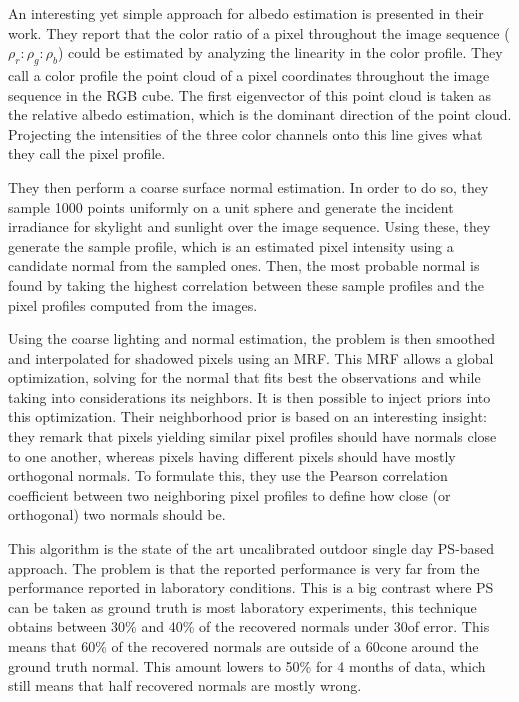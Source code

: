 An interesting yet simple approach for albedo estimation is presented in their work. They report that the color ratio of a pixel throughout the image sequence ($\rho_r : \rho_g : \rho_b$) could be estimated by analyzing the linearity in the color profile. They call a color profile the point cloud of a pixel coordinates throughout the image sequence in the RGB cube. The first eigenvector of this point cloud is taken as the relative albedo estimation, which is the dominant direction of the point cloud. Projecting the intensities of the three color channels onto this line gives what they call the pixel profile.

They then perform a coarse surface normal estimation. In order to do so, they sample 1000 points uniformly on a unit sphere and generate the incident irradiance for skylight and sunlight over the image sequence. Using these, they generate the sample profile, which is an estimated pixel intensity using a candidate normal from the sampled ones. Then, the most probable normal is found by taking the highest correlation between these sample profiles and the pixel profiles computed from the images.

Using the coarse lighting and normal estimation, the problem is then smoothed and interpolated for shadowed pixels using an MRF. This MRF allows a global optimization, solving for the normal that fits best the observations and while taking into considerations its neighbors. It is then possible to inject priors into this optimization. Their neighborhood prior is based on an interesting insight: they remark that pixels yielding similar pixel profiles should have normals close to one another, whereas pixels having different pixels should have mostly orthogonal normals. To formulate this, they use the Pearson correlation coefficient between two neighboring pixel profiles to define how close (or orthogonal) two normals should be.

This algorithm is the state of the art uncalibrated outdoor single day PS-based approach. The problem is that the reported performance is very far from the performance reported in laboratory conditions. This is a big contrast where PS can be taken as ground truth is most laboratory experiments, this technique obtains between 30\% and 40\% of the recovered normals under 30\degree of error. This means that 60\% of the recovered normals are outside of a 60\degree cone around the ground truth normal. This amount lowers to 50\% for 4 months of data, which still means that half recovered normals are mostly wrong.




